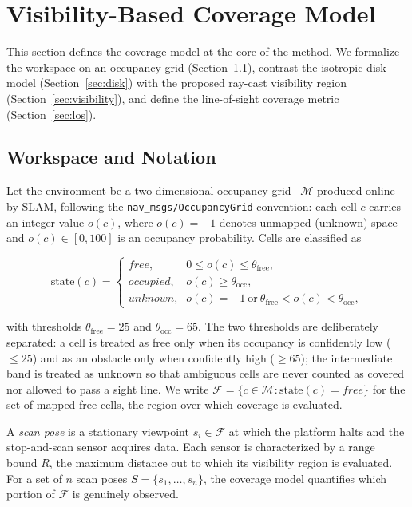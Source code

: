 \documentclass[sensors,article,submit,pdftex,moreauthors]{Definitions/mdpi}
\begin{document}
\section{Visibility-Based Coverage Model}
\label{sec:coverage}

This section defines the coverage model at the core of the method. We formalize
the workspace on an occupancy grid (Section~\ref{sec:notation}), contrast the
isotropic disk model (Section~\ref{sec:disk}) with the proposed ray-cast
visibility region (Section~\ref{sec:visibility}), and define the line-of-sight
coverage metric (Section~\ref{sec:los}).

\subsection{Workspace and Notation}
\label{sec:notation}

Let the environment be a two-dimensional occupancy
grid~\cite{elfes1989,thrun2005} $\mathcal{M}$ produced
online by SLAM, following the \texttt{nav\_msgs/OccupancyGrid} convention: each
cell $c$ carries an integer value $o(c)$, where $o(c)=-1$ denotes unmapped
(unknown) space and $o(c)\in[0,100]$ is an occupancy probability. Cells are
classified as

\begin{equation}
\mathrm{state}(c)=
\begin{cases}
\textit{free}, & 0 \le o(c) \le \theta_{\mathrm{free}}, \\
\textit{occupied}, & o(c) \ge \theta_{\mathrm{occ}}, \\
\textit{unknown}, & o(c)=-1 \ \text{or}\ \theta_{\mathrm{free}}<o(c)<\theta_{\mathrm{occ}},
\end{cases}
\end{equation}

with thresholds $\theta_{\mathrm{free}}=25$ and $\theta_{\mathrm{occ}}=65$. The
two thresholds are deliberately separated: a cell is treated as free only when
its occupancy is confidently low ($\le 25$) and as an obstacle only when
confidently high ($\ge 65$); the intermediate band is treated as unknown so that
ambiguous cells are never counted as covered nor allowed to pass a sight line.
We write $\mathcal{F}=\{c\in\mathcal{M}:\mathrm{state}(c)=\textit{free}\}$ for
the set of mapped free cells, the region over which coverage is evaluated.

A \emph{scan pose} is a stationary viewpoint $s_i\in\mathcal{F}$ at which the
platform halts and the stop-and-scan sensor acquires data. Each sensor is
characterized by a range bound $R$, the maximum distance out to which its
visibility region is evaluated. For a set of $n$ scan poses
$S=\{s_1,\dots,s_n\}$, the coverage model quantifies which portion of
$\mathcal{F}$ is genuinely observed.
\end{document}
